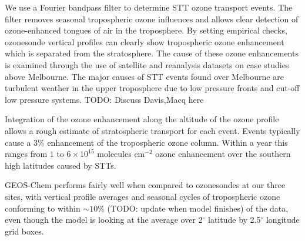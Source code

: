 \documentclass{article}
\begin{document}
  We use a Fourier bandpass filter to determine STT ozone transport events.
  The filter removes seasonal tropospheric ozone influences and allows clear detection of ozone-enhanced tongues of air in the troposphere.
  By setting empirical checks, ozonesonde vertical profiles can clearly show tropospheric ozone enhancement which is separated from the stratosphere.
  The cause of these ozone enhancements is examined through the use of satellite and reanalysis datasets on case studies above Melbourne.
  The major causes of STT events found over Melbourne are turbulent weather in the upper troposphere due to low pressure fronts and cut-off low pressure systems.
  TODO: Discuss Davis,Macq here
  
  Integration of the ozone enhancement along the altitude of the ozone profile allows a rough estimate of stratospheric transport for each event.
  Events typically cause a 3\% enhancement of the tropospheric ozone column.
  Within a year this ranges from $1$ to $6 \times 10^{15}$ molecules cm$^{-2}$ ozone enhancement over the southern high latitudes caused by STTs.
  
  GEOS-Chem performs fairly well when compared to ozonesondes at our three sites, with vertical profile averages and seasonal cycles of tropospheric ozone conforming to within $\sim 10$\% (TODO: update when model finishes) of the data, even though the model is looking at the average over 2$^{\circ}$ latitude by 2.5$^{\circ}$ longitude grid boxes.
  

\end{document}
